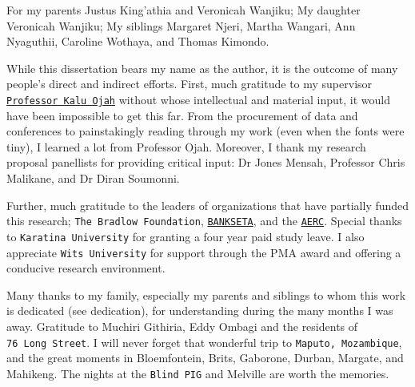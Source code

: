 \documentclass[a4paper, nobind]{templates/ociamthesis}
\begin{document}

\begin{romanpages}

\maketitle

\begin{dedication}
  For my parents Justus King'athia and Veronicah Wanjiku; My daughter Veronicah Wanjiku; My siblings Margaret Njeri, Martha Wangari, Ann Nyaguthii, Caroline Wothaya, and Thomas Kimondo.
\end{dedication}

\begin{acknowledgements}
 	While this dissertation bears my name as the author, it is the outcome of many people's direct and indirect efforts. First, much gratitude to my supervisor \href{https://www.wits.ac.za/staff/academic-a-z-listing/o/kaluojahwitsacza/}{\texttt{Professor\ Kalu\ Ojah}} without whose intellectual and material input, it would have been impossible to get this far. From the procurement of data and conferences to painstakingly reading through my work (even when the fonts were tiny), I learned a lot from Professor Ojah. Moreover, I thank my research proposal panellists for providing critical input: Dr Jones Mensah, Professor Chris Malikane, and Dr Diran Soumonni.

  Further, much gratitude to the leaders of organizations that have partially funded this research; \texttt{The\ Bradlow\ Foundation}, \href{https://www.bankseta.org.za/}{\texttt{BANKSETA}}, and the \href{https://aercafrica.org}{\texttt{AERC}}. Special thanks to \texttt{Karatina\ University} for granting a four year paid study leave. I also appreciate \texttt{Wits\ University} for support through the PMA award and offering a conducive research environment.

  Many thanks to my family, especially my parents and siblings to whom this work is dedicated (see dedication), for understanding during the many months I was away. Gratitude to Muchiri Githiria, Eddy Ombagi and the residents of \texttt{76\ Long\ Street}. I will never forget that wonderful trip to \texttt{Maputo,\ Mozambique}, and the great moments in Bloemfontein, Brits, Gaborone, Durban, Margate, and Mahikeng. The nights at the \texttt{Blind\ PIG} and Melville are worth the memories.


\end{acknowledgements}
\end{romanpages}
\end{document}
